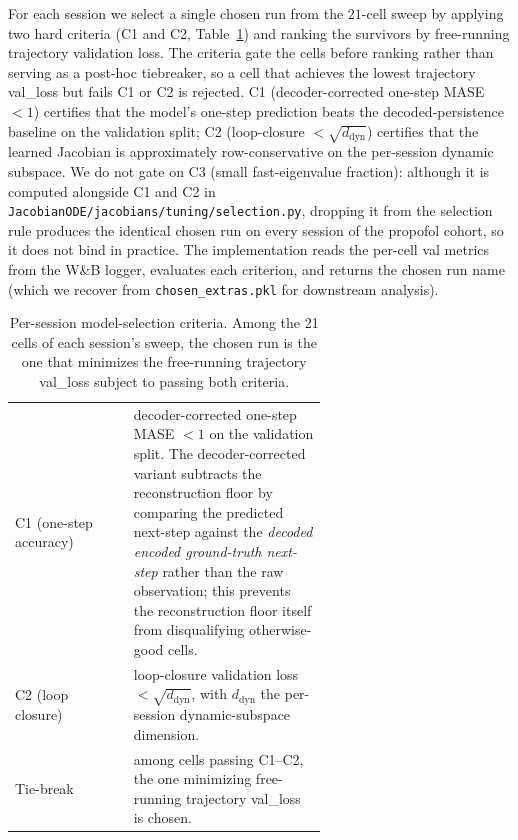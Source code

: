 For each session we select a single chosen run from the $21$-cell sweep by applying two hard criteria (C1 and C2, Table~\ref{tab:supp-interareal-control-criteria}) and ranking the survivors by free-running trajectory validation loss. The criteria gate the cells before ranking rather than serving as a post-hoc tiebreaker, so a cell that achieves the lowest trajectory val\_loss but fails C1 or C2 is rejected. C1 (decoder-corrected one-step MASE $<1$) certifies that the model's one-step prediction beats the decoded-persistence baseline on the validation split; C2 (loop-closure $<\sqrt{d_{\mathrm{dyn}}}$) certifies that the learned Jacobian is approximately row-conservative on the per-session dynamic subspace. We do not gate on C3 (small fast-eigenvalue fraction): although it is computed alongside C1 and C2 in \texttt{JacobianODE/jacobians/tuning/selection.py}, dropping it from the selection rule produces the identical chosen run on every session of the propofol cohort, so it does not bind in practice. The implementation reads the per-cell val metrics from the W\&B logger, evaluates each criterion, and returns the chosen run name (which we recover from \texttt{chosen\_extras.pkl} for downstream analysis).

\begin{table}[h!]
\centering
\small
\caption[Per-session model-selection criteria]{Per-session model-selection criteria. Among the 21 cells of each session's sweep, the chosen run is the one that minimizes the free-running trajectory val\_loss subject to passing both criteria.}
\label{tab:supp-interareal-control-criteria}
\begin{tabular}{lp{0.62\linewidth}}
\toprule
C1 (one-step accuracy) & decoder-corrected one-step MASE $<1$ on the validation split. The decoder-corrected variant subtracts the reconstruction floor by comparing the predicted next-step against the \emph{decoded encoded ground-truth next-step} rather than the raw observation; this prevents the reconstruction floor itself from disqualifying otherwise-good cells. \\
C2 (loop closure) & loop-closure validation loss $<\sqrt{d_{\mathrm{dyn}}}$, with $d_{\mathrm{dyn}}$ the per-session dynamic-subspace dimension. \\
Tie-break & among cells passing C1--C2, the one minimizing free-running trajectory val\_loss is chosen. \\
\bottomrule
\end{tabular}
\end{table}

